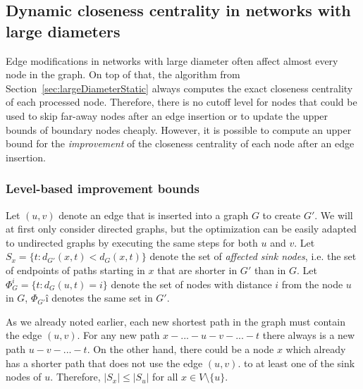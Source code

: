 \FloatBarrier

\subsection{Dynamic closeness centrality in networks with large diameters}
Edge modifications in networks with large diameter often affect almost every node in the graph. On top of that, the algorithm from Section~\ref{sec:largeDiameterStatic} always computes the exact closeness centrality of each processed node. Therefore, there is no cutoff level for nodes that could be used to skip far-away nodes after an edge insertion or to update the upper bounds of boundary nodes cheaply. However, it is possible to compute an upper bound for the \emph{improvement} of the closeness centrality of each node after an edge insertion.

\subsubsection{Level-based improvement bounds}
Let $(u, v)$ denote an edge that is inserted into a graph $G$ to create $G'$. We will at first only consider directed graphs, but the optimization can be easily adapted to undirected graphs by executing the same steps for both $u$ and $v$.  Let $S_{x} = \{t : d_{G'}(x, t) < d_G(x, t)\}$ denote the set of \emph{affected sink nodes}, i.e. the set of endpoints of paths starting in $x$ that are shorter in $G'$ than in $G$. Let $\Phi_{G}^i = \{t : d_G(u, t) = i\}$ denote the set of nodes with distance $i$ from the node $u$ in $G$, $\Phi_{G'}î$ denotes the same set in $G'$.

As we already noted earlier, each new shortest path in the graph must contain the edge $(u, v)$. For any new path $x - ... - u - v - ... - t$ there always is a new path $u - v - ... - t$. On the other hand, there could be a node $x$ which already has a shorter path that does not use the edge $(u, v)$. to at least one of the sink nodes of $u$. Therefore, $|S_x| \leq |S_u|$ for all $x \in V \setminus \{u\}$.


